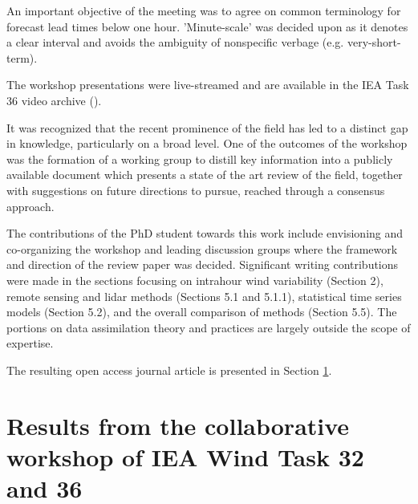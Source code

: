 An important objective of the meeting was to agree on common terminology for forecast lead times below one hour. 'Minute-scale' was decided upon as it denotes a clear interval and avoids the ambiguity of nonspecific verbage (e.g. very-short-term).

The workshop presentations were live-streamed and are available in the IEA Task 36 video archive (\cite{iea_36_youtube}).

It was recognized that the recent prominence of the field has led to a distinct gap in knowledge, particularly on a broad level. One of the outcomes of the workshop was the formation of a working group to distill key information into a publicly available document which presents a state of the art review of the field, together with suggestions on future directions to pursue, reached through a consensus approach.

The contributions of the PhD student towards this work include envisioning and co-organizing the workshop and leading discussion groups where the framework and direction of the review paper was decided. Significant writing contributions were made in the sections focusing on intrahour wind variability (Section 2), remote sensing and lidar methods (Sections 5.1 and 5.1.1), statistical time series models (Section 5.2), and the overall comparison of methods (Section 5.5). The portions on data assimilation theory and practices are largely outside the scope of expertise.

The resulting open access journal article is presented in Section \ref{sec:IEA_paper}. 


\clearpage
\section{Results from the collaborative workshop of IEA Wind Task 32 and 36}
\label{sec:IEA_paper}
